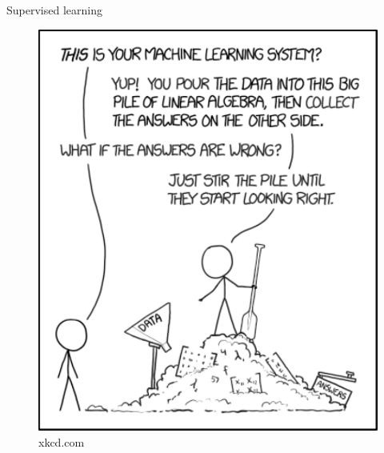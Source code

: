 \begin{frame}{Supervised learning}
  \begin{figure}
	\includegraphics[width=\linewidth,height=0.8\textheight,keepaspectratio]{images/xkcd_machine_learning.pdf}
	\caption{xkcd.com}
  \end{figure}
\end{frame}


